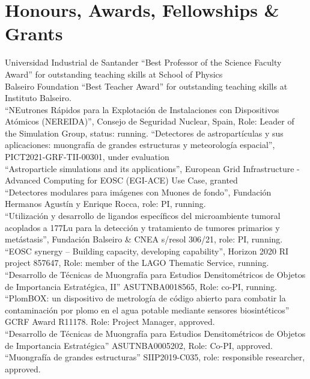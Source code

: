 \ifeng
\section*{Honours, Awards, Fellowships \& Grants}
\noindent
{} Universidad Industrial de Santander ``Best Professor of the Science Faculty Award'' for outstanding teaching skills at School of Physics\\
 Balseiro Foundation ``Best Teacher Award'' for outstanding teaching skills at Instituto Balseiro.\\
 ``NEutrones Rápidos para la Explotación de Instalaciones con Dispositivos Atómicos (NEREIDA)'', Consejo de Seguridad Nuclear, Spain, Role: Leader of the Simulation Group, status: running.
 ``Detectores de astropartículas y sus aplicaciones: muongrafía de grandes estructuras y meteorología espacial'', PICT2021-GRF-TII-00301, under evaluation\\
 ``Astroparticle simulations and its applications'', European Grid Infrastructure - Advanced Computing for EOSC (EGI-ACE) Use Case, granted\\
 ``Detectores modulares para imágenes con Muones de fondo'', Fundación Hermanos Agustín y Enrique Rocca, role: PI, running.\\
 ``Utilización y desarrollo de ligandos específicos del microambiente tumoral acoplados a 177Lu para la detección y tratamiento de tumores primarios y metástasis'', Fundación Balseiro \& CNEA s/resol 306/21, role: PI, running.\\
 ``EOSC synergy – Building capacity, developing capability'', Horizon 2020 RI project 857647, Role: member of the LAGO Thematic Service, running.\\
 ``Desarrollo de Técnicas de Muongrafía para Estudios Densitométricos de Objetos de Importancia Estratégica, II'' ASUTNBA0018565, Role: co-PI, running.\\
 ``PlomBOX: un dispositivo de metrología de código abierto para combatir la contaminación por plomo en el agua potable mediante sensores biosintéticos'' GCRF Award R11178. Role: Project Manager, approved.\\
 ``Desarrollo de Técnicas de Muongrafía para Estudios Densitométricos de Objetos de Importancia Estratégica'' ASUTNBA0005202, Role: Co-PI, approved.\\
 ``Muongrafía de grandes estructuras'' SIIP2019-C035, role: responsible researcher, approved.\\
